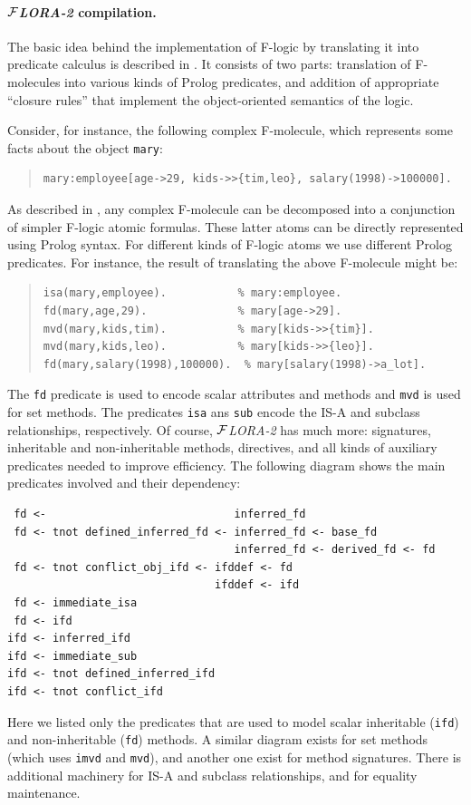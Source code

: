 \documentclass[11pt]{article}
\newcommand{\FLORA}{{\mbox{${\cal F}${\small\it LORA}\rm\emph{-2}}}\xspace}
\newcommand{\fl}{\mbox{F-logic}\xspace}
\begin{document}
\paragraph{\FLORA compilation.}
The basic idea behind the implementation of \fl by translating it into
predicate calculus is described in \cite{KLW95}. It consists of two parts:
translation of F-molecules into various kinds of Prolog predicates, and
addition of appropriate ``closure rules'' that implement the
object-oriented semantics of the logic.

Consider, for instance, the following complex F-molecule, which represents
some facts about the object \texttt{mary}:

\begin{quote}
\begin{verbatim}
mary:employee[age->29, kids->>{tim,leo}, salary(1998)->100000].
\end{verbatim}
\end{quote}

As described in \cite{KLW95}, any complex F-molecule can be
decomposed into a conjunction of simpler \fl atomic formulas. These
latter atoms can be directly represented using Prolog syntax.  For
different kinds of \fl atoms we use different Prolog predicates. For
instance, the result of translating the above F-molecule might be:

\begin{quote}
\begin{verbatim}
isa(mary,employee).           % mary:employee.
fd(mary,age,29).              % mary[age->29].
mvd(mary,kids,tim).           % mary[kids->>{tim}].
mvd(mary,kids,leo).           % mary[kids->>{leo}].
fd(mary,salary(1998),100000).  % mary[salary(1998)->a_lot].
\end{verbatim}
\end{quote}

The {\tt fd} predicate is used to encode scalar attributes and methods and
{\tt mvd} is used for set methods. The predicates {\tt isa} ans {\tt sub}
encode the IS-A and subclass relationships, respectively.
Of course, \FLORA has much more: signatures, inheritable and
non-inheritable methods, directives, and all kinds of auxiliary predicates
needed to improve efficiency. The following diagram shows the main
predicates involved and their dependency:
\begin{verbatim}
 fd <-                             inferred_fd
 fd <- tnot defined_inferred_fd <- inferred_fd <- base_fd
                                   inferred_fd <- derived_fd <- fd
 fd <- tnot conflict_obj_ifd <- ifddef <- fd
                                ifddef <- ifd
 fd <- immediate_isa
 fd <- ifd
ifd <- inferred_ifd
ifd <- immediate_sub
ifd <- tnot defined_inferred_ifd
ifd <- tnot conflict_ifd
\end{verbatim}
Here we listed only the predicates that are used to model scalar
inheritable ({\tt ifd}) and non-inheritable ({\tt fd}) methods.  A similar
diagram exists for set methods (which uses {\tt imvd} and {\tt mvd}), and
another one exist for method signatures. There is additional machinery for
IS-A and subclass relationships, and for equality maintenance.
\end{document}

